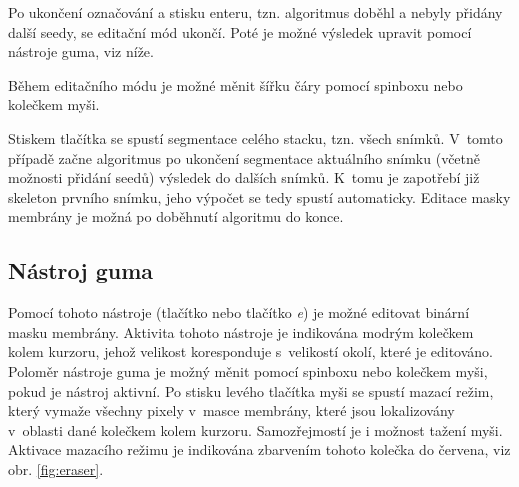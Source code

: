 Po ukončení označování a stisku enteru, tzn. algoritmus doběhl a nebyly přidány další seedy, se editační mód ukončí. Poté je možné výsledek upravit pomocí nástroje guma, viz níže.

Během editačního módu je možné měnit šířku čáry pomocí spinboxu  nebo kolečkem myši.

Stiskem tlačítka  se spustí segmentace celého stacku, tzn. všech snímků. V~tomto případě začne algoritmus po ukončení segmentace aktuálního snímku (včetně možnosti přidání seedů) výsledek  do dalších snímků. K~tomu je zapotřebí již skeleton prvního snímku, jeho výpočet se tedy spustí automaticky. Editace masky membrány je možná po doběhnutí algoritmu do konce.

\subsection{Nástroj guma}
Pomocí tohoto nástroje (tlačítko  nebo tlačítko \textit{e}) je možné editovat binární masku membrány. Aktivita tohoto nástroje je indikována modrým kolečkem kolem kurzoru, jehož velikost koresponduje s~velikostí okolí, které je editováno. Poloměr nástroje guma je možný měnit pomocí spinboxu  nebo kolečkem myši, pokud je nástroj aktivní. Po stisku levého tlačítka myši se spustí mazací režim, který vymaže všechny pixely v~masce membrány, které jsou lokalizovány v~oblasti dané kolečkem kolem kurzoru. Samozřejmostí je i možnost tažení myši. Aktivace mazacího režimu je indikována zbarvením tohoto kolečka do červena, viz obr. \ref{fig:eraser}.

